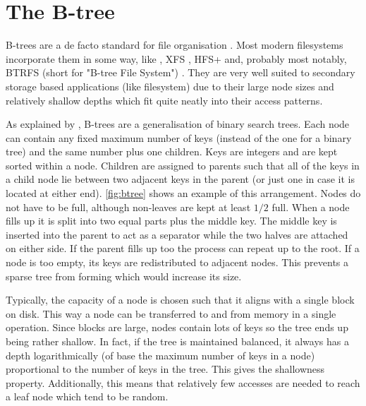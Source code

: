     \section{The B-tree}
        \label{sec:btree}

        B-trees are a de facto standard for file organisation
        \cite{btree_ubiquitous}. Most modern filesystems incorporate them in
        some way, like , XFS
        \cite{XFS_scalability}, HFS+ \cite{HFSplus} and, probably most notably,
        BTRFS (short for "B-tree File System") \cite{BTRFS}. They are very well
        suited to secondary storage based applications (like filesystem) due to
        their large node sizes and relatively shallow depths which fit quite
        neatly into their access patterns.

        As explained by , B-trees are a
        generalisation of binary search trees. Each node can contain any fixed
        maximum number of keys (instead of the one for a binary tree) and the
        same number plus one children. Keys are integers and are kept sorted
        within a node. Children are assigned to parents such that all of the
        keys in a child node lie between two adjacent keys in the parent (or
        just one in case it is located at either end). \autoref{fig:btree}
        shows an example of this arrangement. Nodes do not have to be
        full, although non-leaves are kept at least $1/2$ full. When a node
        fills up it is split into two equal parts plus the middle key. The
        middle key is inserted into the parent to act as a separator while the
        two halves are attached on either side. If the parent fills up too the
        process can repeat up to the root. If a node is too empty, its keys are
        redistributed to adjacent nodes. This prevents a sparse tree from
        forming which would increase its size.

        Typically, the capacity of a node is chosen such that it aligns with a
        single block on disk. This way a node can be transferred to and from
        memory in a single operation. Since blocks are large, nodes contain
        lots of keys so the tree ends up being rather shallow. In fact, if the
        tree is maintained balanced, it always has a depth logarithmically (of
        base the maximum number of keys in a node) proportional to the number
        of keys in the tree. This gives the shallowness property. Additionally,
        this means that relatively few accesses are needed to reach a leaf node
        which tend to be random.

